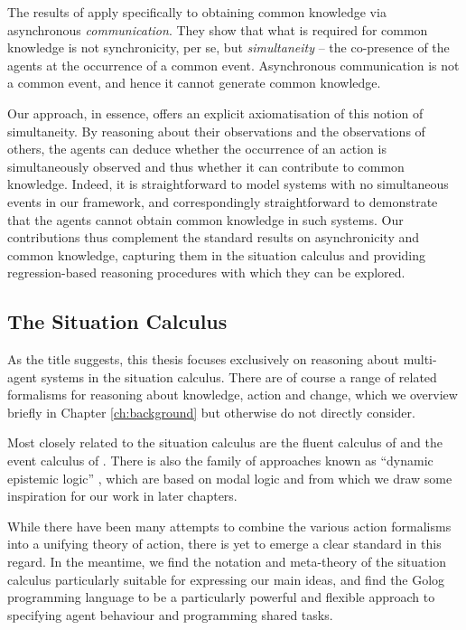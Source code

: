 The results of \citep{halpern90knowledge_distrib} apply specifically
to obtaining common knowledge via asynchronous \emph{communication}.
They show that what is required for common knowledge is not synchronicity,
per se, but \emph{simultaneity} -- the co-presence of the agents at
the occurrence of a common event. Asynchronous communication is not
a common event, and hence it cannot generate common knowledge.

Our approach, in essence, offers an explicit axiomatisation of this
notion of simultaneity. By reasoning about their observations and
the observations of others, the agents can deduce whether the occurrence
of an action is simultaneously observed and thus whether it can contribute
to common knowledge. Indeed, it is straightforward to model systems
with no simultaneous events in our framework, and correspondingly
straightforward to demonstrate that the agents cannot obtain common
knowledge in such systems. Our contributions thus complement the standard
results on asynchronicity and common knowledge, capturing them in
the situation calculus and providing regression-based reasoning procedures
with which they can be explored.


\subsection{The Situation Calculus}

As the title suggests, this thesis focuses exclusively on reasoning
about multi-agent systems in the situation calculus. There are of
course a range of related formalisms for reasoning about knowledge,
action and change, which we overview briefly in Chapter \ref{ch:background}
but otherwise do not directly consider.

Most closely related to the situation calculus are the fluent calculus
of \citet{thielscher98fluent_calculus} and the event calculus of
\citet{kowalski86event_calculus}. There is also the family of approaches
known as {}``dynamic epistemic logic'' \citep{baltag98pa_ck,vanBenthem06lcc,vanBentham06tree_of_knowledge},
which are based on modal logic and from which we draw some inspiration
for our work in later chapters.

While there have been many attempts to combine the various action
formalisms into a unifying theory of action, there is yet to emerge
a clear standard in this regard. In the meantime, we find the notation
and meta-theory of the situation calculus particularly suitable for
expressing our main ideas, and find the Golog programming language
to be a particularly powerful and flexible approach to specifying
agent behaviour and programming shared tasks.

